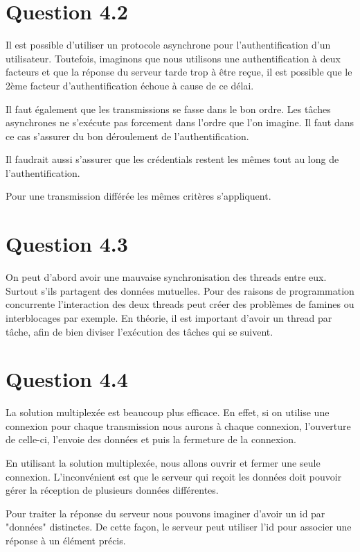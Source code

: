 \documentclass[12pt]{article}
\begin{document}
\section*{Question 4.2}

Il est possible d'utiliser un protocole asynchrone pour l'authentification d'un utilisateur.
Toutefois, imaginons que nous utilisons une authentification à deux facteurs et que la réponse du serveur tarde trop à être reçue, il est possible que le 2ème facteur d'authentification échoue à cause de ce délai.

Il faut également que les transmissions se fasse dans le bon ordre. Les tâches asynchrones ne s'exécute pas forcement dans l'ordre que l'on imagine. Il faut dans ce cas s'assurer du bon déroulement de l'authentification.

Il faudrait aussi s'assurer que les crédentials restent les mêmes tout au long de l'authentification.

Pour une transmission différée les mêmes critères s'appliquent.


\section*{Question 4.3}
On peut d'abord avoir une mauvaise synchronisation des threads entre eux. Surtout s'ils partagent des données mutuelles. Pour des raisons de programmation concurrente l'interaction des deux threads peut créer des problèmes de famines ou interblocages par exemple.
En théorie, il est important d'avoir un thread par tâche, afin de bien diviser l'exécution des tâches qui se suivent.

\section*{Question 4.4}

La solution multiplexée est beaucoup plus efficace. En effet, si on utilise une connexion pour chaque transmission nous aurons à chaque connexion, l'ouverture de celle-ci, l'envoie des données et puis la fermeture de la connexion. 

En utilisant la solution multiplexée, nous allons ouvrir et fermer une seule connexion.
L'inconvénient est que le serveur qui reçoit les données doit pouvoir gérer la réception de plusieurs données différentes.

Pour traiter la réponse du serveur nous pouvons imaginer d'avoir un id par "données" distinctes. De cette façon, le serveur peut utiliser l'id pour associer une réponse à un élément précis.
\end{document}
